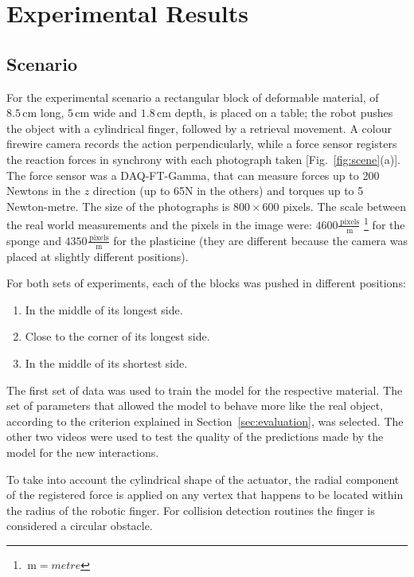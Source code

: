 \documentclass[journal]{IEEEtran}
\newcommand{\fref}[1]{Fig.~\ref{#1}}
\newcommand{\sref}[1]{Section~\ref{#1}}
\newcommand{\unit}[1]{\ensuremath{\, \mathrm{#1}}}
\begin{document}
\section{Experimental Results}
\label{sec:experiments}
\subsection{Scenario}
For the experimental scenario a rectangular block of deformable material, of $8.5 \unit{cm}$ long, $5 \unit{cm}$ wide and $1.8 \unit{cm}$ depth, is placed on a table; the robot pushes the object with a cylindrical finger, followed by a retrieval movement.  A colour firewire camera records the action perpendicularly, while a force sensor registers the reaction forces in synchrony with each photograph taken [\fref{fig:scene}(a)].  The force sensor was a DAQ-FT-Gamma, that can measure forces up to 200 Newtons in the $z$ direction (up to 65N in the others) and torques up to 5 Newton-metre.  The size of the photographs is $800 \times 600$ pixels.  The scale between the real world measurements and the pixels in the image were: $4600\frac{\unit{pixels}}{\unit{m}}$ \footnote{$\unit{m}=metre$} for the sponge and $4350\frac{\unit{pixels}}{\unit{m}}$ for the plasticine (they are different because the camera was placed at slightly different positions).

For both sets of experiments, each of the blocks was pushed in different positions:
\begin{enumerate}
 \item In the middle of its longest side.
 \item Close to the corner of its longest side.
 \item In the middle of its shortest side.
\end{enumerate}
The first set of data was used to train the model for the respective material.  The set of parameters that allowed the model to behave more like the real object, according to the criterion explained in \sref{sec:evaluation}, was selected.  The other two videos were used to test the quality of the predictions made by the model for the new interactions.

To take into account the cylindrical shape of the actuator, the radial component of the registered force is applied on any vertex that happens to be located within the radius of the robotic finger.  For collision detection routines the finger is considered a circular obstacle.
\end{document}

